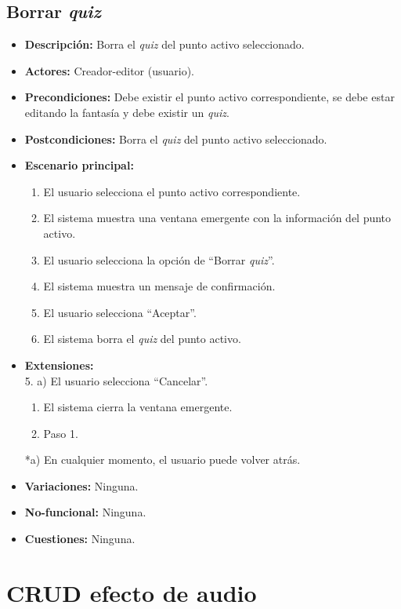 \subsection{Borrar \textit{quiz}}
\begin{itemize}
	\item \textbf{Descripción:} Borra el \textit{quiz} del punto activo seleccionado.
	\item \textbf{Actores:} Creador-editor (usuario).
	\item \textbf{Precondiciones:} Debe existir el punto activo correspondiente, se debe estar editando la fantasía y debe existir un \textit{quiz}.
	\item \textbf{Postcondiciones:} Borra el \textit{quiz} del punto activo seleccionado.
	\item \textbf{Escenario principal:}
	\begin{enumerate}
		\item El usuario selecciona el punto activo correspondiente.
		\item El sistema muestra una ventana emergente con la información del punto activo.
		\item El usuario selecciona la opción de ``Borrar \textit{quiz}''.
		\item El sistema muestra un mensaje de confirmación.
		\item El usuario selecciona ``Aceptar''.
		\item El sistema borra el \textit{quiz} del punto activo.
	\end{enumerate}
	\item \textbf{Extensiones:} \\ 5. a) El usuario selecciona ``Cancelar''.
	\begin{enumerate}
		\item El sistema cierra la ventana emergente.
		\item Paso 1.
	\end{enumerate}
	*a) En cualquier momento, el usuario puede volver atrás.
	\item \textbf{Variaciones:} Ninguna.
	\item \textbf{No-funcional:} Ninguna.
	\item \textbf{Cuestiones:} Ninguna.
\end{itemize}

\section{CRUD efecto de audio}
\hypertarget{crearaudio}{}
